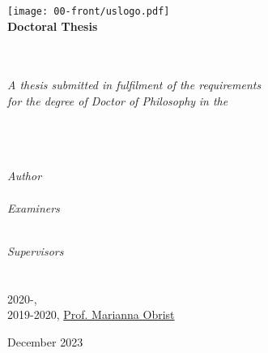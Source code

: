 \thispagestyle{empty}
{}
\begin{center}
	\texttt{[image: 00-front/uslogo.pdf]}\\[1cm]%

	\textbf{\Large Doctoral Thesis}

	\Huge \textbf{\myTitle}\\[0.5cm] %
	\large \textbf{\mySubtitle}\\[2cm]
	\large \textit{A thesis submitted in fulfilment of the requirements\\ for the degree of Doctor of Philosophy} %
	\textit{in the}\\[1.2cm]
	\myDepartment\\ \myFaculty\\ \myUni\\[0.4cm]
	\vspace*{0.25cm}
	\begin{minipage}[t]{.39\linewidth}
		\begin{flushleft} %
		\emph{Author}\\
		\href{\myNameLink}{\myName}\\
		\emph{Examiners}\\
		\href{https://scholar.google.co.uk/citations?user=XUfk6ekAAAAJ&hl=en&oi=ao}{\myFirstExaminer} 		\\
		\href{https://scholar.google.com/citations?user=4k-k6SEAAAAJ&hl=en&oi=ao}{\mySecondExaminer}
		\end{flushleft}
	\end{minipage}
	\begin{minipage}[t]{.59\linewidth}
		\begin{flushright} %
		\emph{Supervisors}\\
		\href{https://scholar.google.com/citations?user=66uLtDEAAAAJ&hl=en&oi=ao}{\myFirstSupervisor} 			\\
		\href{https://scholar.google.com/citations?user=JJd597sAAAAJ&hl=en&oi=ao}{\mySecondSupervisor} 	\\
		2020-, \href{https://scholar.google.com/citations?user=7PaqoJcAAAAJ&hl=en&oi=ao}{\myThirdSupervisor} 	\\
		2019-2020, \href{https://scholar.google.com/citations?user=yN-L6cIAAAAJ&hl=en&oi=ao}{Prof. Marianna Obrist} 
		\end{flushright}
	\end{minipage}
	\vfill
	\large December 2023
\end{center}
